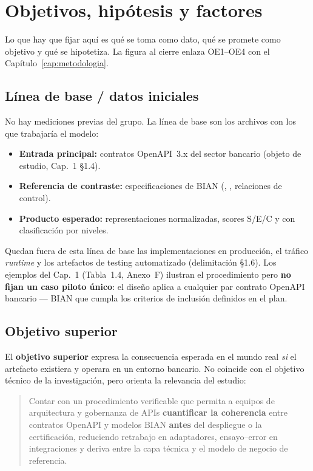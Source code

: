 \chapter{Objetivos, hipótesis y factores}
\label{cap:objetivos}

Lo que hay que fijar aquí es qué se toma como dato, qué se promete como objetivo y qué se
hipotetiza. La figura al cierre enlaza OE1--OE4 con el Capítulo~\ref{cap:metodologia}.

\section{Línea de base / datos iniciales}

No hay mediciones previas del grupo. La línea de base son los archivos con los que trabajaría el
modelo:

\begin{itemize}
  \item \textbf{Entrada principal:} contratos OpenAPI~3.x del sector bancario (objeto de estudio,
        Cap.~1 §1.4).
  \item \textbf{Referencia de contraste:} especificaciones de \ServiceDomain{} BIAN (\Behavior{},
        \BusinessObject{}, relaciones de control).
  \item \textbf{Producto esperado:} representaciones normalizadas, scores S/E/C y
        \AlignmentScore{} con clasificación por niveles.
\end{itemize}

Quedan fuera de esta línea de base las implementaciones en producción, el tráfico \textit{runtime} y
los artefactos de testing automatizado (delimitación §1.6). Los ejemplos del Cap.~1 (Tabla~1.4,
Anexo~F) ilustran el procedimiento pero \textbf{no fijan un caso piloto único}: el diseño aplica a
cualquier par contrato OpenAPI bancario --- \ServiceDomain{} BIAN que cumpla los criterios de
inclusión definidos en el plan.

\section{Objetivo superior}

El \textbf{objetivo superior} expresa la consecuencia esperada en el mundo real \textit{si} el
artefacto existiera y operara en un entorno bancario. No coincide con el objetivo técnico de la
investigación, pero orienta la relevancia del estudio:

\begin{quote}
  Contar con un procedimiento verificable que permita a equipos de arquitectura y gobernanza de APIs
  \textbf{cuantificar la coherencia} entre contratos OpenAPI y modelos BIAN \textbf{antes} del
  despliegue o la certificación, reduciendo retrabajo en adaptadores, ensayo--error en integraciones
  y deriva entre la capa técnica y el modelo de negocio de referencia.
\end{quote}


